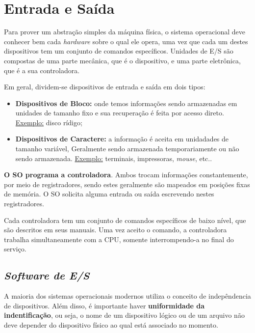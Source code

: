 \chapter{Entrada e Saída}

Para prover um abstração simples da máquina física, o sistema operacional deve conhecer bem cada \textit{hardware} sobre o qual ele opera, uma vez que cada um destes dispositivos tem um conjunto de comandos específicos. Unidades de E/S são compostas de uma parte mecânica, que é o dispositivo, e uma parte eletrônica, que é a sua controladora.

Em geral, dividem-se dispositivos de entrada e saída em dois tipos:
\begin{itemize}
  \item \textbf{Dispositivos de Bloco:} onde temos informações sendo armazenadas em unidades de tamanho fixo e sua recuperação é feita por acesso direto. \underline{Exemplo:} disco rídigo;

  \item \textbf{Dispositivos de Caractere:} a informação é aceita em unidadades de tamanho variável, Geralmente sendo armazenada temporariamente ou não sendo armazenada. \underline{Exemplo:} terminais, impressoras, \textit{mouse}, etc..
\end{itemize}

\textbf{O SO programa a controladora}. Ambos trocam informações constantemente, por meio de registradores, sendo estes geralmente são mapeados em posições fixas de memória. O SO solicita alguma entrada ou saída escrevendo nestes registradores.

Cada controladora tem um conjunto de comandos específicos de baixo nível, que são descritos em seus manuais. Uma vez aceito o comando, a controladora trabalha simultaneamente com a CPU, somente interrompendo-a no final do serviço.







\section{\textit{Software de E/S}}
A maioria dos sistemas operacionais modernos utiliza o conceito de indepêndencia de dispositivos. Além disso, é importante haver \textbf{uniformidade da indentificação}, ou seja, o nome de um dispositivo lógico ou de um arquivo não deve depender do dispositivo físico ao qual está associado no momento.

